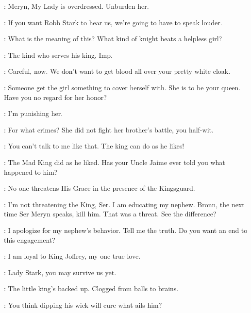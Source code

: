 \JOFFREY: Meryn, My Lady is overdressed. Unburden her. 


\JOFFREY: If you want Robb Stark to hear us, we're going to have to speak louder. 



\TYRION: What is the meaning of this? What kind of knight beats a helpless girl? 

\MERYN: The kind who serves his king, Imp. 

\BRONN: Careful, now. We don't want to get blood all over your pretty white cloak. 

\TYRION: Someone get the girl something to cover herself with. She is to be your queen. Have you no regard for her honor? 


\JOFFREY: I'm punishing her. 

\TYRION: For what crimes? She did not fight her brother's battle, you half-wit. 

\JOFFREY: You can't talk to me like that. The king can do as he likes! 

\TYRION: The Mad King did as he liked. Has your Uncle Jaime ever told you what happened to him? 

\MERYN: No one threatens His Grace in the presence of the Kingsguard. 

\TYRION: I'm not threatening the King, Ser. I am educating my nephew. Bronn, the next time Ser Meryn speaks, kill him. That was a threat. See the difference? 


\TYRION: I apologize for my nephew's behavior. Tell me the truth. Do you want an end to this engagement? 

\SANSA: I am loyal to King Joffrey, my one true love. 


\TYRION: Lady Stark, you may survive us yet. 


\BRONN: The little king's backed up. Clogged from balls to brains. 

\TYRION: You think dipping his wick will cure what ails him? 

